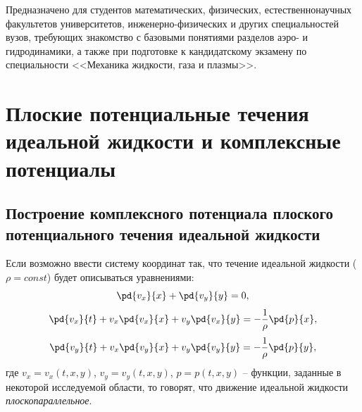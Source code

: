 \documentclass[14pt]{extarticle}
\begin{document}
Предназначено для студентов математических, физических, естественнонаучных факультетов университетов, инженерно-физических и других специальностей вузов, требующих знакомство с базовыми понятиями разделов аэро- и гидродинамики, а также при подготовке к кандидатскому экзамену по специальности <<Механика жидкости, газа и плазмы>>.	

%
%
%	
%	


\newpage\normalfont\normalsize
\tableofcontents
	
\newpage
	
\section{Плоские потенциальные течения идеальной жидкости и комплексные потенциалы}



\subsection{Построение комплексного потенциала плоского потенциального течения идеальной жидкости }

Если возможно ввести систему координат так, что течение идеальной жидкости ($\rho=const$) будет описываться уравнениями:	
\begin{equation}
	\label{eq:ideal_liquid_planar_mass}
	\pd{v_x}{x}+\pd{v_y}{y} = 0,
\end{equation}
\begin{equation}
	\label{eq:ideal_liquid_planar_momentum_x}
	\pd{v_x}{t}+v_x \pd{v_x}{x} + v_y \pd{v_x}{y} = -\frac{1}{\rho} \pd{p}{x},
\end{equation}	
\begin{equation}
	\label{eq:ideal_liquid_planar_momentum_y}
	\pd{v_y}{t}+v_x \pd{v_y}{x} + v_y \pd{v_y}{y} = -\frac{1}{\rho} \pd{p}{y},	
\end{equation}
где $v_x = v_x(t,x,y)$, $v_y = v_y(t,x,y)$, $p=p(t,x,y)$ -- функции, заданные в некоторой исследуемой области, то говорят, что движение идеальной жидкости \textit{плоскопараллельное}.
\end{document}
